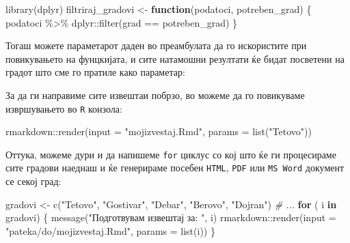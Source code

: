 \documentclass[
]{book}
\newenvironment{Shaded}{\begin{snugshade}}{\end{snugshade}}
\newcommand{\AttributeTok}[1]{\textcolor[rgb]{0.77,0.63,0.00}{#1}}
\newcommand{\CommentTok}[1]{\textcolor[rgb]{0.56,0.35,0.01}{\textit{#1}}}
\newcommand{\ControlFlowTok}[1]{\textcolor[rgb]{0.13,0.29,0.53}{\textbf{#1}}}
\newcommand{\FunctionTok}[1]{\textcolor[rgb]{0.00,0.00,0.00}{#1}}
\newcommand{\NormalTok}[1]{#1}
\newcommand{\OtherTok}[1]{\textcolor[rgb]{0.56,0.35,0.01}{#1}}
\newcommand{\SpecialCharTok}[1]{\textcolor[rgb]{0.00,0.00,0.00}{#1}}
\newcommand{\StringTok}[1]{\textcolor[rgb]{0.31,0.60,0.02}{#1}}
\begin{document}
\begin{Shaded}
\begin{Highlighting}[]
\FunctionTok{library}\NormalTok{(dplyr)}
\NormalTok{filtriraj\_gradovi }\OtherTok{\textless{}{-}} \ControlFlowTok{function}\NormalTok{(podatoci, potreben\_grad) \{}
\NormalTok{  podatoci }\SpecialCharTok{\%\textgreater{}\%}\NormalTok{ dplyr}\SpecialCharTok{::}\FunctionTok{filter}\NormalTok{(grad }\SpecialCharTok{==}\NormalTok{ potreben\_grad)}
\NormalTok{\}}
\end{Highlighting}
\end{Shaded}

Тогаш можете параметарот даден во преамбулата да го искористите при повикувањето на фунцкијата, и сите натамошни резултати ќе бидат посветени на градот што сме го пратиле како параметар:

\begin{Shaded}
\end{Shaded}

За да ги направиме сите извештаи побрзо, во можеме да го повикуваме извршувањето во \texttt{R} конзола:

\begin{Shaded}
\begin{Highlighting}[]
\NormalTok{rmarkdown}\SpecialCharTok{::}\FunctionTok{render}\NormalTok{(}\AttributeTok{input =} \StringTok{"mojizvestaj.Rmd"}\NormalTok{, }\AttributeTok{params =} \FunctionTok{list}\NormalTok{(}\StringTok{"Tetovo"}\NormalTok{))}
\end{Highlighting}
\end{Shaded}

Оттука, можеме дури и да напишеме \texttt{for} циклус со кој што ќе ги процесираме сите градови наеднаш и ќе генерираме посебен \texttt{HTML}, \texttt{PDF} или \texttt{MS\ Word} документ се секој град:

\begin{Shaded}
\begin{Highlighting}[]
\NormalTok{gradovi }\OtherTok{\textless{}{-}} \FunctionTok{c}\NormalTok{(}\StringTok{"Tetovo"}\NormalTok{, }\StringTok{"Gostivar"}\NormalTok{, }\StringTok{"Debar"}\NormalTok{, }\StringTok{"Berovo"}\NormalTok{, }\StringTok{"Dojran"}\NormalTok{) }\CommentTok{\# ...}
\ControlFlowTok{for}\NormalTok{ ( i }\ControlFlowTok{in}\NormalTok{ gradovi) \{}
  \FunctionTok{message}\NormalTok{(}\StringTok{"Подготвувам извештај за: "}\NormalTok{, i)}
\NormalTok{  rmarkdown}\SpecialCharTok{::}\FunctionTok{render}\NormalTok{(}\AttributeTok{input =} \StringTok{"pateka/do/mojizvestaj.Rmd"}\NormalTok{, }\AttributeTok{params =} \FunctionTok{list}\NormalTok{(i))}
\NormalTok{\}}
\end{Highlighting}
\end{Shaded}
\end{document}
